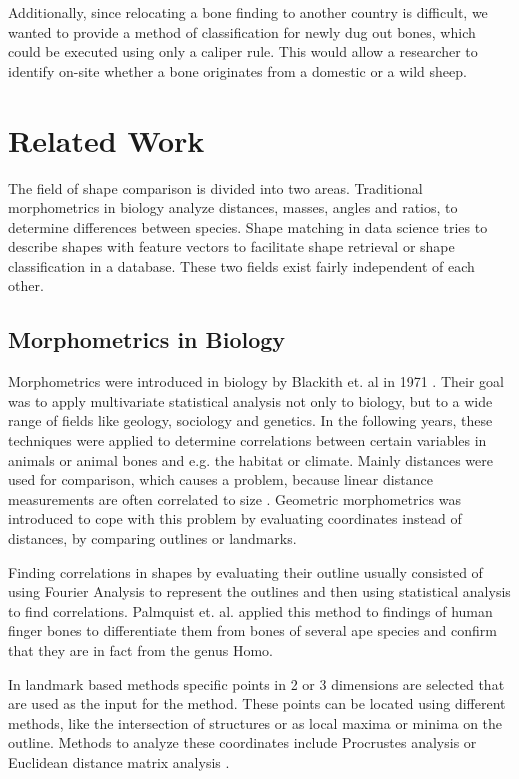 \documentclass[pdftex,12pt,a4paper]{report}
\begin{document}
Additionally, since relocating a bone finding to another country is difficult, we wanted to provide a method of classification for newly dug out bones, which could be executed using only a caliper rule. This would allow a researcher to identify on-site whether a bone originates from a domestic or a wild sheep. 

\chapter{Related Work}
\label{chapter:related}

The field of shape comparison is divided into two areas. Traditional morphometrics in biology analyze distances, masses, angles and ratios, to determine differences between species. Shape matching in data science tries to describe shapes with feature vectors to facilitate shape retrieval or shape classification in a database. These two fields exist fairly independent of each other.

\section{Morphometrics in Biology}

Morphometrics were introduced in biology by Blackith et. al in 1971 \cite{blackith1971multivariate}. Their goal was to apply multivariate statistical analysis not only to biology, but to a wide range of fields like geology, sociology and genetics. In the following years, these techniques were applied to determine correlations between certain variables in animals or animal bones and e.g. the habitat or climate. Mainly distances were used for comparison, which causes a problem, because linear distance measurements are often correlated to size \cite{bookstein1985morphometrics}. Geometric morphometrics was introduced to cope with this problem by evaluating coordinates instead of distances, by comparing outlines or landmarks.

Finding correlations in shapes by evaluating their outline usually consisted of using Fourier Analysis to represent the outlines and then using statistical analysis to find correlations. Palmquist et. al. \cite{palmqvist1996comparative} applied this method to findings of human finger bones to differentiate them from bones of several ape species and confirm that they are in fact from the genus Homo. 

In landmark based methods specific points in 2 or 3 dimensions are selected that are used as the input for the method. These points can be located using different methods, like the intersection of structures or as local maxima or minima on the outline. Methods to analyze these coordinates include Procrustes analysis \cite{small1996statistical} or Euclidean distance matrix analysis \cite{lele1991euclidean}.
\end{document}

